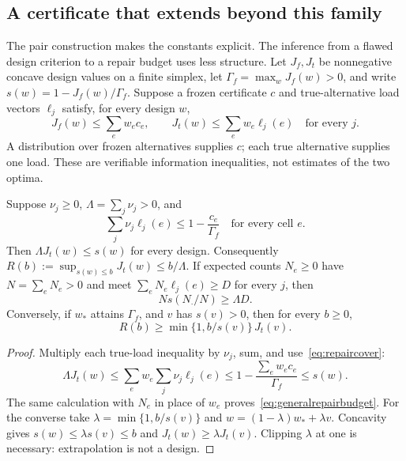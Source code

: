 \subsection{A certificate that extends beyond this family}
\label{sec:repaircertificate}
The pair construction makes the constants explicit. The inference from a flawed design
criterion to a repair budget uses less structure. Let $J_f,J_t$ be nonnegative concave design
values on a finite simplex, let $\Gamma_f=\max_wJ_f(w)>0$, and write
$s(w)=1-J_f(w)/\Gamma_f$. Suppose a frozen certificate $c$ and true-alternative load vectors
$\ell_j$ satisfy, for every design $w$,
\[
J_f(w)\le\sum_e w_ec_e,\qquad
J_t(w)\le\sum_e w_e\ell_j(e)\quad\text{for every }j.
\]
A distribution over frozen alternatives supplies $c$; each true alternative supplies one
load. These are verifiable information inequalities, not estimates of the two optima.

\begin{proposition}
\label{prop:repaircertificate}
Suppose $\nu_j\ge0$, $\Lambda=\sum_j\nu_j>0$, and
\begin{equation}
\sum_j\nu_j\ell_j(e)\le1-\frac{c_e}{\Gamma_f}\quad\text{for every cell }e.
\label{eq:repaircover}
\end{equation}
Then $\Lambda J_t(w)\le s(w)$ for every design. Consequently
$R(b):=\sup_{s(w)\le b}J_t(w)\le b/\Lambda$.
If expected counts $N_e\ge0$ have $N=\sum_eN_e>0$ and meet
$\sum_eN_e\ell_j(e)\ge D$ for every $j$, then
\begin{equation}
N s(N_{\cdot}/N)\ge\Lambda D.
\label{eq:generalrepairbudget}
\end{equation}
Conversely, if $w_*$ attains $\Gamma_f$, and $v$ has $s(v)>0$, then for every $b\ge0$,
\begin{equation}
R(b)\ge\min\{1,b/s(v)\}\,J_t(v).
\label{eq:clippedrepair}
\end{equation}
\end{proposition}
\begin{proof}
Multiply each true-load inequality by $\nu_j$, sum, and use~\eqref{eq:repaircover}:
\[
\Lambda J_t(w)\le\sum_e w_e\sum_j\nu_j\ell_j(e)
\le1-\frac{\sum_e w_ec_e}{\Gamma_f}\le s(w).
\]
The same calculation with $N_e$ in place of $w_e$ proves~\eqref{eq:generalrepairbudget}.
For the converse take $\lambda=\min\{1,b/s(v)\}$ and
$w=(1-\lambda)w_*+\lambda v$. Concavity gives $s(w)\le\lambda s(v)\le b$ and
$J_t(w)\ge\lambda J_t(v)$. Clipping $\lambda$ at one is necessary: extrapolation is not a design.
\end{proof}

